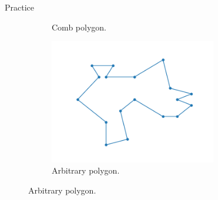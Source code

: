 \documentclass{beamer}
\begin{document}
\begin{frame}{Practice}
\begin{figure}[h!]
\begin{subfigure}{0.45\textwidth}
			\caption{Comb polygon.}
			\label{fig:comb}
		\end{subfigure}
		\begin{subfigure}{0.45\textwidth}
			\centering
			\includegraphics[width = 0.8\textwidth]{Images/random.png}
			\caption{Arbitrary polygon.}
			\label{fig:random}
		\end{subfigure}
	\end{figure}
\end{frame}

\end{document}
